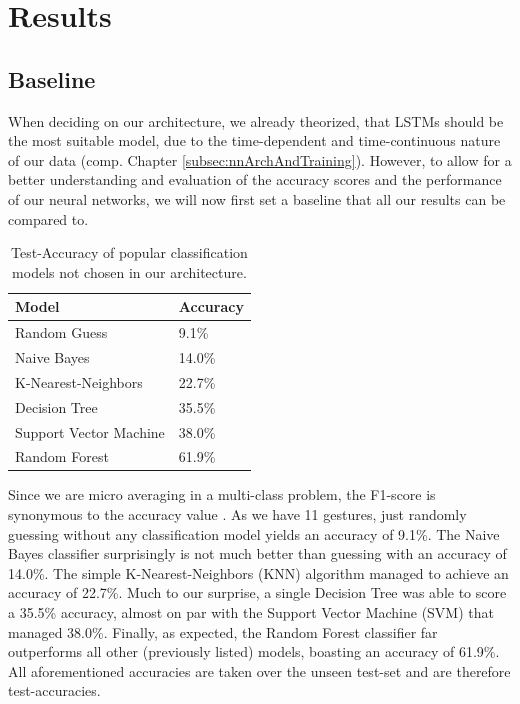 \documentclass[runningheads]{llncs}
\begin{document}
\section{Results}
\subsection{Baseline}
When deciding on our architecture, we already theorized, that LSTMs should be the most suitable model, due to the time-dependent and time-continuous nature of our data (comp. Chapter \ref{subsec:nnArchAndTraining}). However, to allow for a better understanding and evaluation of the accuracy scores and the performance of our neural networks, we will now first set a baseline that all our results can be compared to. 
\begin{table}
\centering
\caption{Test-Accuracy of popular classification models not chosen in our architecture.}\label{tab:baselineTable}
\begin{tabular}{|l|l|}
    \hline
    Model & Accuracy\\
    \hline
    Random Guess & 9.1\%\\
    Naive Bayes & 14.0\%\\
    K-Nearest-Neighbors & 22.7\%\\
    Decision Tree & 35.5\%\\
    Support Vector Machine & 38.0\%\\
    Random Forest & 61.9\%\\
    \hline
\end{tabular}
\end{table}
Since we are micro averaging in a multi-class problem, the F1-score is synonymous to the accuracy value \cite{accuracyEqualsF1Score}.
As we have 11 gestures, just randomly guessing without any classification model yields an accuracy of 9.1\%. The Naive Bayes classifier surprisingly is not much better than guessing with an accuracy of 14.0\%. The simple K-Nearest-Neighbors (KNN) algorithm managed to achieve an accuracy of 22.7\%. Much to our surprise, a single Decision Tree was able to score a 35.5\% accuracy, almost on par with the Support Vector Machine (SVM) that managed 38.0\%. Finally, as expected, the Random Forest classifier far outperforms all other (previously listed) models, boasting an accuracy of 61.9\%. All aforementioned accuracies are taken over the unseen test-set and are therefore test-accuracies.
\end{document}
